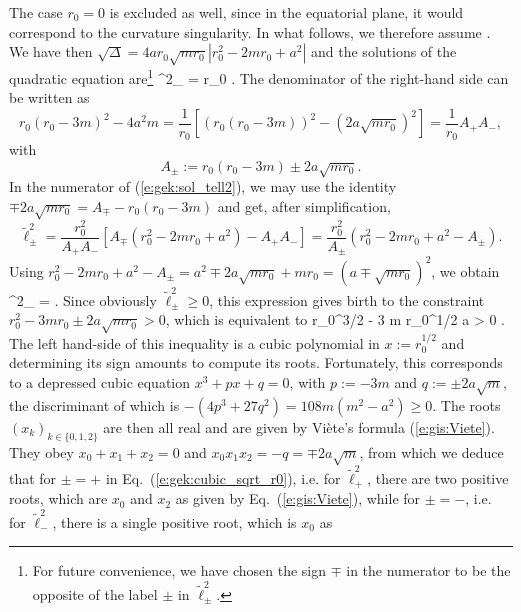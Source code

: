 The case $r_0=0$ is excluded as well, since in the equatorial plane, it would
correspond to the curvature singularity. In what follows, we therefore assume
\be \label{e:gek:circ_r0_positive}
    .
\ee
We have then $\sqrt{\mathit{\Delta}} = 4 a r_0 \sqrt{m r_0} |r_0^2 - 2m r_0 + a^2|$
and the solutions of the quadratic equation are\footnote{For future convenience, we have
chosen the sign $\mp$ in the numerator to be the opposite of the label $\pm$
in $\tilde{\ell}^2_{\pm}$.}
\be \label{e:gek:sol_tell2}
    \tilde{\ell}^2_{\pm} = r_0  .
\ee
The denominator of the right-hand side can be written as
\[
    r_0 (r_0 - 3m)^2  - 4 a^2 m = \frac{1}{r_0} \left[
        \left( r_0 (r_0 - 3m) \right) ^2 - \left( 2 a \sqrt{m r_0} \right) ^2 \right]
        = \frac{1}{r_0} A_+ A_- ,
\]
with
\[
    A_\pm := r_0 (r_0 - 3m) \pm 2 a \sqrt{m r_0} .
\]
In the numerator of (\ref{e:gek:sol_tell2}), we may use the identity
$\mp 2 a \sqrt{m r_0} = A_\mp - r_0 (r_0 - 3m)$ and get, after
simplification,
\[
    \tilde{\ell}^2_{\pm} = \frac{r_0^2}{A_+ A_-} \left[ A_\mp (r_0^2 - 2m r_0 + a^2)
     - A_+ A_- \right] = \frac{r_0^2}{A_\pm} \left(
        r_0^2 - 2m r_0 + a^2 - A_\pm \right) .
\]
Using $r_0^2 - 2m r_0 + a^2 - A_\pm  =  a^2 \mp 2a \sqrt{m r_0} + m r_0 =
(a \mp \sqrt{m r_0})^2$, we obtain
\be \label{e:gek:tell2_circ}
    \tilde{\ell}^2_{\pm} =  .
\ee
Since obviously $\tilde{\ell}^2_{\pm} \geq 0$, this expression gives birth to
the constraint $r_0^2 - 3m r_0 \pm 2 a \sqrt{m r_0} > 0$,
which is equivalent to
\be \label{e:gek:cubic_sqrt_r0}
    r_0^{3/2} - 3 m r_0^{1/2}   a  > 0 .
\ee
The left hand-side of this inequality is a cubic polynomial in $x:=r_0^{1/2}$
and determining its sign amounts to compute its roots. Fortunately, this
corresponds to
a depressed cubic equation $x^3 + px + q = 0$, with $p:= -3m$ and $q:=\pm 2 a \sqrt{m}$,
the discriminant of which is $-(4 p^3 + 27 q^2) = 108 m (m^2 - a^2) \geq 0$. The roots
$(x_k)_{k\in\{0,1,2\}}$ are then all real and are given by Viète's formula (\ref{e:gis:Viete}).
They obey $x_0 + x_1 + x_2 = 0$ and $x_0 x_1 x_2 = -q = \mp 2 a \sqrt{m}$,
from which we deduce that for $\pm = +$ in Eq.~(\ref{e:gek:cubic_sqrt_r0}), i.e. for
$\tilde{\ell}^2_+$, there are two positive roots, which are $x_0$ and $x_2$
as given by Eq.~(\ref{e:gis:Viete}), while for $\pm = -$, i.e. for
$\tilde{\ell}^2_-$, there is a single positive root, which is $x_0$ as
